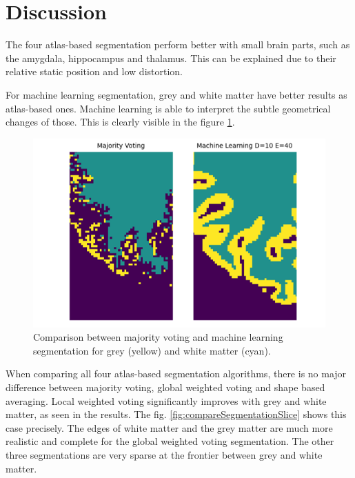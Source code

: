 \section*{Discussion}
The four atlas-based segmentation perform better with small brain parts, such as the amygdala, hippocampus and thalamus. This can be explained due to their relative static position and low distortion. 

For machine learning segmentation, grey and white matter have better results as atlas-based ones. Machine learning is able to interpret the subtle geometrical changes of those. This is clearly visible in the figure \ref{fig:compareGreyMatter}.

\begin{figure}[h!]
	\centering
	\includegraphics[width=\linewidth]{img/compareGreyMatter}
	\caption{Comparison between majority voting and machine learning segmentation for grey (yellow) and white matter (cyan).}
	\label{fig:compareGreyMatter}
\end{figure}

When comparing all four atlas-based segmentation algorithms, there is no major difference between majority voting, global weighted voting and shape based averaging. Local weighted voting significantly improves with grey and white matter, as seen in the results. The fig. \ref{fig:compareSegmentationSlice} shows this case precisely. The edges of white matter and the grey matter are much more realistic and complete for the global weighted voting segmentation. The other three segmentations are very sparse at the frontier between grey and white matter.

